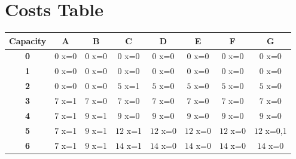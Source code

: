 \documentclass{article}
\begin{document}
\section{Costs Table}
\begin{center}
    \begin{tabular}{|c||c|c|c|c|c|c|c|}
        \hline
        \textbf{Capacity} & \textbf{A} & \textbf{B} & \textbf{C} & \textbf{D} & \textbf{E} & \textbf{F} & \textbf{G} \\
        \hline
        \hline
        \textbf{0}& \cellcolor[HTML]{FC3F3F}$0$ x={0}& \cellcolor[HTML]{FC3F3F}$0$ x={0}& \cellcolor[HTML]{FC3F3F}$0$ x={0}& \cellcolor[HTML]{FC3F3F}$0$ x={0}& \cellcolor[HTML]{FC3F3F}$0$ x={0}& \cellcolor[HTML]{FC3F3F}$0$ x={0}& \cellcolor[HTML]{FC3F3F}$0$ x={0}\\
        \hline
        \textbf{1}& \cellcolor[HTML]{FC3F3F}$0$ x={0}& \cellcolor[HTML]{FC3F3F}$0$ x={0}& \cellcolor[HTML]{FC3F3F}$0$ x={0}& \cellcolor[HTML]{FC3F3F}$0$ x={0}& \cellcolor[HTML]{FC3F3F}$0$ x={0}& \cellcolor[HTML]{FC3F3F}$0$ x={0}& \cellcolor[HTML]{FC3F3F}$0$ x={0}\\
        \hline
        \textbf{2}& \cellcolor[HTML]{FC3F3F}$0$ x={0}& \cellcolor[HTML]{FC3F3F}$0$ x={0}& \cellcolor[HTML]{3FFC45}$5$ x={1} & \cellcolor[HTML]{FC3F3F}$5$ x={0}& \cellcolor[HTML]{FC3F3F}$5$ x={0}& \cellcolor[HTML]{FC3F3F}$5$ x={0}& \cellcolor[HTML]{FC3F3F}$5$ x={0}\\
        \hline
        \textbf{3}& \cellcolor[HTML]{3FFC45}$7$ x={1} & \cellcolor[HTML]{FC3F3F}$7$ x={0}& \cellcolor[HTML]{FC3F3F}$7$ x={0}& \cellcolor[HTML]{FC3F3F}$7$ x={0}& \cellcolor[HTML]{FC3F3F}$7$ x={0}& \cellcolor[HTML]{FC3F3F}$7$ x={0}& \cellcolor[HTML]{FC3F3F}$7$ x={0}\\
        \hline
        \textbf{4}& \cellcolor[HTML]{3FFC45}$7$ x={1} & \cellcolor[HTML]{3FFC45}$9$ x={1} & \cellcolor[HTML]{FC3F3F}$9$ x={0}& \cellcolor[HTML]{FC3F3F}$9$ x={0}& \cellcolor[HTML]{FC3F3F}$9$ x={0}& \cellcolor[HTML]{FC3F3F}$9$ x={0}& \cellcolor[HTML]{FC3F3F}$9$ x={0}\\
        \hline
        \textbf{5}& \cellcolor[HTML]{3FFC45}$7$ x={1} & \cellcolor[HTML]{3FFC45}$9$ x={1} & \cellcolor[HTML]{3FFC45}$12$ x={1} & \cellcolor[HTML]{FC3F3F}$12$ x={0}& \cellcolor[HTML]{FC3F3F}$12$ x={0}& \cellcolor[HTML]{FC3F3F}$12$ x={0}& \cellcolor[HTML]{3F62FC}$12$ x={0,1}\\
        \hline
        \textbf{6}& \cellcolor[HTML]{3FFC45}$7$ x={1} & \cellcolor[HTML]{3FFC45}$9$ x={1} & \cellcolor[HTML]{3FFC45}$14$ x={1} & \cellcolor[HTML]{FC3F3F}$14$ x={0}& \cellcolor[HTML]{FC3F3F}$14$ x={0}& \cellcolor[HTML]{FC3F3F}$14$ x={0}& \cellcolor[HTML]{FC3F3F}$14$ x={0}\\

\end{tabular}
\end{center}
\end{document}
